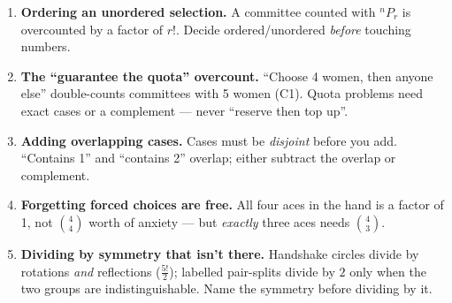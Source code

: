 \documentclass[11pt,a4paper]{article}
\begin{document}
\begin{enumerate}[leftmargin=2em, itemsep=4pt]
  \item \textbf{Ordering an unordered selection.} A committee counted with ${}^nP_r$ is overcounted by a factor of $r!$. Decide ordered/unordered \emph{before} touching numbers. 
  \item \textbf{The ``guarantee the quota'' overcount.} ``Choose 4 women, then anyone else'' double-counts committees with 5 women (C1). Quota problems need exact cases or a complement --- never ``reserve then top up''. 
  \item \textbf{Adding overlapping cases.} Cases must be \emph{disjoint} before you add. ``Contains 1'' and ``contains 2'' overlap; either subtract the overlap or complement. 
  \item \textbf{Forgetting forced choices are free.} All four aces in the hand is a factor of 1, not $\binom{4}{4}$ worth of anxiety --- but \emph{exactly} three aces needs $\binom{4}{3}$. 
  \item \textbf{Dividing by symmetry that isn't there.} Handshake circles divide by rotations \emph{and} reflections ($\frac{5!}{2}$); labelled pair-splits divide by $2$ only when the two groups are indistinguishable. Name the symmetry before dividing by it. 
\end{enumerate}

\end{document}
